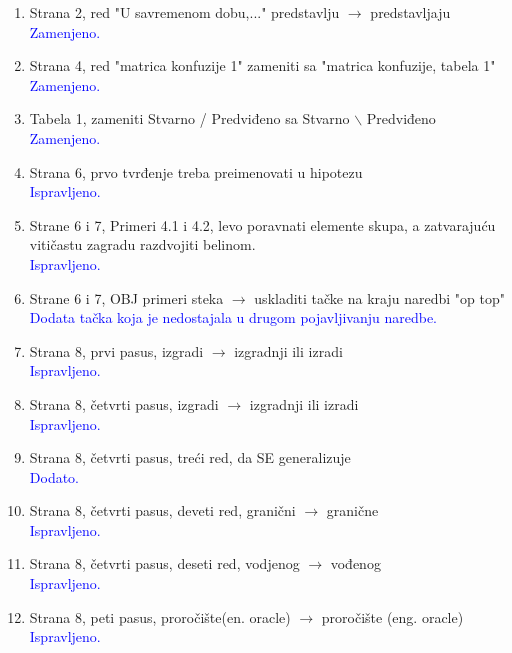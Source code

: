 \documentclass[a4paper]{report}
\newcommand{\odgovor}[1]{\textcolor{blue}{#1}}
\begin{document}
\begin{enumerate}
\item Strana 2, red "U savremenom dobu,..." predstavlju $\rightarrow$ predstavljaju
\\ \odgovor{Zamenjeno.}

\item Strana 4, red "matrica konfuzije 1" zameniti sa "matrica konfuzije, tabela 1"
\\ \odgovor{Zamenjeno.}

\item Tabela 1, zameniti Stvarno / Predviđeno sa Stvarno $\backslash$ Predviđeno
\\ \odgovor{Zamenjeno.}

\item Strana 6, prvo tvrđenje treba preimenovati u hipotezu
\\\odgovor{Ispravljeno.}

\item Strane 6 i 7, Primeri 4.1 i 4.2, levo poravnati elemente skupa,
a zatvarajuću vitičastu zagradu razdvojiti belinom.
\\\odgovor{Ispravljeno.}

\item Strane 6 i 7, OBJ primeri steka $\rightarrow$ uskladiti tačke na kraju naredbi "op top"
\\\odgovor{Dodata tačka koja je nedostajala u drugom pojavljivanju naredbe.}

\item Strana 8, prvi pasus, izgradi $\rightarrow$ izgradnji ili izradi
\\ \odgovor{Ispravljeno.}

\item Strana 8, četvrti pasus, izgradi $\rightarrow$ izgradnji ili izradi
\\ \odgovor{Ispravljeno.}

\item Strana 8, četvrti pasus, treći red, da SE generalizuje
\\ \odgovor{Dodato.}

\item Strana 8, četvrti pasus, deveti red, granični $\rightarrow$ granične
\\ \odgovor{Ispravljeno.}

\item Strana 8, četvrti pasus, deseti red, vodjenog $\rightarrow$ vođenog
\\ \odgovor{Ispravljeno.}

\item Strana 8, peti pasus, proročište(en. oracle) $\rightarrow$ proročište (eng. oracle)
\\ \odgovor{Ispravljeno.}


\end{enumerate}
\end{document}
